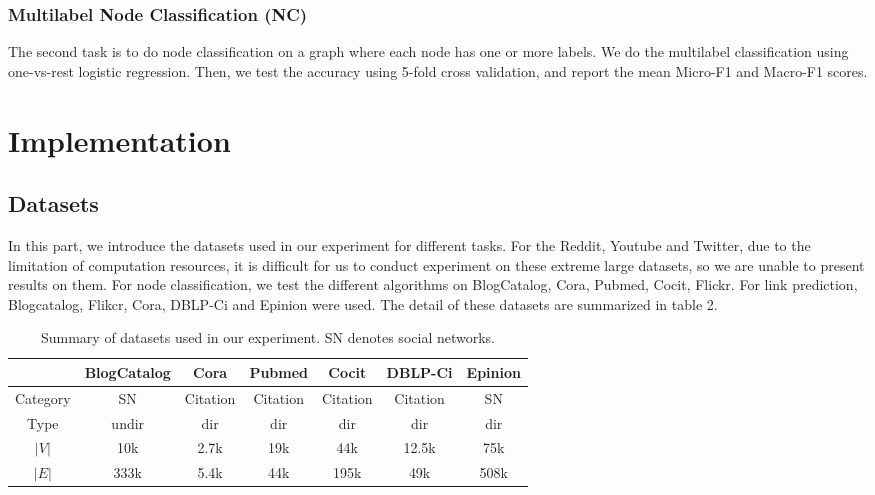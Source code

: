 \documentclass[a4paper]{article}
\begin{document}
\subsubsection{Multilabel Node Classification (NC)}

\noindent The second task is to do node classification on a graph where each node has one or more labels. We do the multilabel classification using one-vs-rest logistic regression. Then, we test the accuracy using 5-fold cross validation, and report the mean Micro-F1 and Macro-F1 scores.


\section{Implementation}

\subsection{Datasets}
\noindent In this part, we introduce the datasets used in our experiment for different tasks. For the Reddit, Youtube and Twitter, due to the limitation of computation resources, it is difficult for us to conduct experiment on these extreme large datasets, so we are unable to present results on them. For node classification, we test the different algorithms on BlogCatalog, Cora, Pubmed, Cocit, Flickr. For link prediction, Blogcatalog, Flikcr, Cora, DBLP-Ci and Epinion were used. The detail of these datasets are summarized in table 2.
\begin{table}[H]
    \centering
\begin{tabular}{c|c|c|c|c|c|c}
\toprule  
& BlogCatalog& Cora & Pubmed& Cocit &DBLP-Ci &Epinion\\
\midrule  
Category & SN& Citation&Citation&Citation&Citation &SN\\
Type& undir& dir & dir & dir & dir & dir\\
$|V|$ &10k &2.7k &19k &44k &12.5k & 75k\\
$|E|$ &333k & 5.4k &44k & 195k &49k &508k\\
\bottomrule 
\end{tabular}
\caption{Summary of datasets used in our experiment. SN denotes social networks.}
\end{table}
\end{document}
